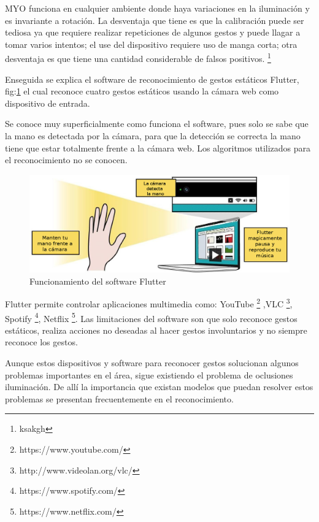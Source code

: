 MYO funciona en cualquier ambiente donde haya variaciones en la iluminación y es invariante a rotación. La desventaja que tiene es que la calibración puede ser tediosa ya que requiere realizar repeticiones de algunos gestos y puede llagar a tomar varios intentos; el use del dispositivo requiere uso de manga corta; otra desventaja es que tiene una cantidad considerable de falsos positivos. \footnote{ksakgh} 


Enseguida se explica el software de reconocimiento de gestos estáticos Flutter, fig:\ref{fig:Flutter} el cual reconoce cuatro gestos estáticos usando la cámara web como dispositivo de entrada. 

Se conoce muy superficialmente como funciona el software, pues solo se sabe que la mano es detectada por la cámara, para que la detección se correcta la mano tiene que estar totalmente frente a la cámara web. Los algoritmos utilizados para el reconocimiento no se conocen.  
\begin{figure}[h!]
\begin{center}
\includegraphics[scale=.4]{./Figures/Flutter.jpg}
\end{center}
\caption{Funcionamiento del software Flutter}
\label{fig:Flutter}
\end{figure}

Flutter permite controlar aplicaciones multimedia como: YouTube \footnote{https://www.youtube.com/} ,VLC \footnote{http://www.videolan.org/vlc/}, Spotify \footnote{https://www.spotify.com/}, Netflix \footnote{https://www.netflix.com/}. Las limitaciones del software son que solo reconoce gestos estáticos, realiza acciones no deseadas al hacer gestos involuntarios y no siempre reconoce los gestos.  


Aunque estos dispositivos y software para reconocer gestos solucionan algunos problemas importantes en el área, sigue existiendo el problema de oclusiones iluminación.
De allí la importancia que existan modelos que puedan resolver estos problemas se presentan frecuentemente en el reconocimiento.





